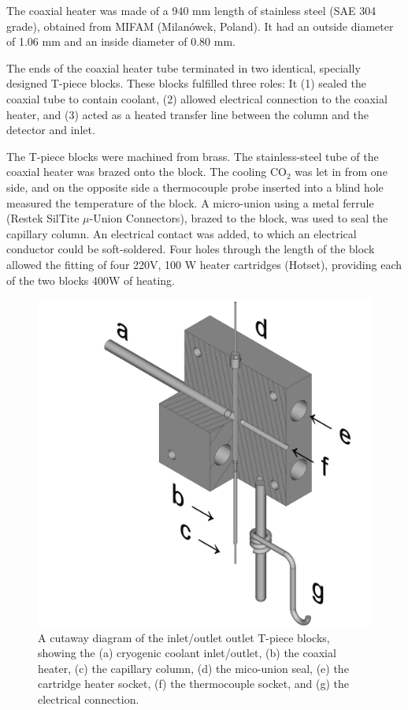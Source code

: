 \documentclass[aip,rsi,preprint,graphicx]{revtex4-1} %
\begin{document}
The coaxial heater was made of a 940 mm length of stainless steel (SAE 304
grade), obtained from MIFAM (Milanówek, Poland). It had an outside diameter of
1.06 mm and an inside diameter of 0.80 mm.

The ends of the coaxial heater tube terminated in two identical, specially
designed T-piece blocks. These blocks fulfilled three roles: It (1) sealed the
coaxial tube to contain coolant, (2) allowed electrical connection to the
coaxial heater, and (3) acted as a heated transfer line between the column and
the detector and inlet.

The T-piece blocks were machined from brass. The stainless-steel tube of the
coaxial heater was brazed onto the block. The cooling CO$_2$ was let in from one
side, and on the opposite side a thermocouple probe inserted into a blind hole
measured the temperature of the block. A micro-union using a metal ferrule
(Restek\texttrademark{} SilTite $\mu$-Union Connectors), brazed to the block,
was used to seal the capillary column. An electrical contact was added, to which
an electrical conductor could be soft-soldered. Four holes through the length of
the block allowed the fitting of four 220V, 100 W heater cartridges (Hotset),
providing each of the two blocks 400W of heating.

\begin{figure}
	\includegraphics[width=\textwidth]{./Figures/Cutaway_with_symbols.png}
	\caption["The T-piece block"]{A cutaway diagram of the inlet/outlet outlet T-piece blocks, showing the (a) cryogenic coolant inlet/outlet, (b) the coaxial heater, (c) the capillary column, (d) the mico-union seal, (e) the cartridge heater socket, (f) the thermocouple socket, and (g) the electrical connection.}%
	\label{fig:Manifold}
\end{figure}
\end{document}
